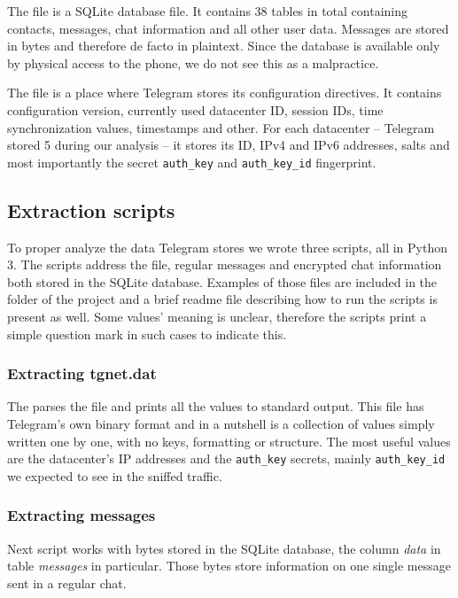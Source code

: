 \documentclass[thesis=M,english]{FITthesis}[2012/10/20]
\begin{document}
The  file is a SQLite database file. It contains 38 tables in total containing contacts, messages, chat information and all other user data. Messages are stored in bytes and therefore de facto in plaintext. Since the database is available only by physical access to the phone, we do not see this as a malpractice.

The  file is a place where Telegram stores its configuration directives. It contains configuration version, currently used datacenter ID, session IDs, time synchronization values, timestamps and other. For each datacenter -- Telegram stored 5 during our analysis -- it stores its ID, IPv4 and IPv6 addresses, salts and most importantly the secret \texttt{auth\_key} and \texttt{auth\_key\_id} fingerprint.

\subsection{Extraction scripts}

To proper analyze the data Telegram stores we wrote three scripts, all in Python 3. The scripts address the  file, regular messages and encrypted chat information both stored in the SQLite database. Examples of those files are included in the  folder of the project and a brief readme file describing how to run the scripts is present as well. Some values' meaning is unclear, therefore the scripts print a simple question mark in such cases to indicate this.

\subsubsection{Extracting tgnet.dat}

The  parses the  file and prints all the values to standard output. This file has Telegram's own binary format and in a nutshell is a collection of values simply written one by one, with no keys, formatting or structure. The most useful values are the datacenter's IP addresses and the \texttt{auth\_key} secrets, mainly \texttt{auth\_key\_id} we expected to see in the sniffed traffic.

\subsubsection{Extracting messages}

Next script  works with bytes stored in the SQLite database, the column \emph{data} in table \emph{messages} in particular. Those bytes store information on one single message sent in a regular chat.
\end{document}
